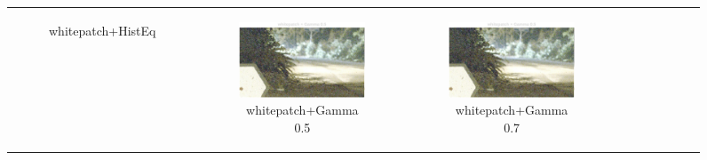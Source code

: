 \documentclass[11pt, a4]{article}
\begin{document}
\begin{enumerate}
\begin{figure}[H]
{\begin{tabular}{cccc}
\begin{subfigure}[h]{0.45\linewidth}
							\caption{whitepatch+HistEq}
							\label{fig:RawImage3_tone_5}
						\end{subfigure} &
						\begin{subfigure}[h]{0.45\linewidth}
							\centering
							\includegraphics[width=\linewidth]{../output/RawImage3_Tone_whitepatch_Gamma0.5.pdf}
							\caption{whitepatch+Gamma 0.5}
							\label{fig:RawImage3_tone_6}
						\end{subfigure} &
						\begin{subfigure}[h]{0.45\linewidth}
							\centering
							\includegraphics[width=\linewidth]{../output/RawImage3_Tone_whitepatch_Gamma0.5.pdf}
							\caption{whitepatch+Gamma 0.7}
							\label{fig:RawImage3_tone_7}
						\end{subfigure} &
						\begin{subfigure}[h]{0.45\linewidth}
							\centering

\end{subfigure}
\end{tabular}}
\end{figure}
\end{enumerate}
\end{document}
